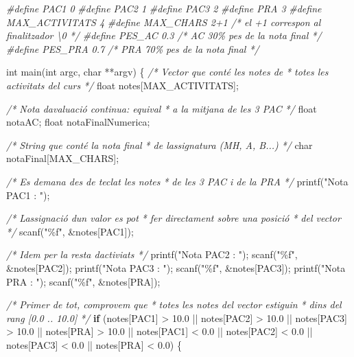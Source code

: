 \documentclass[
]{book}
\newenvironment{Shaded}{\begin{snugshade}}{\end{snugshade}}
\newcommand{\CommentTok}[1]{\textcolor[rgb]{0.56,0.35,0.01}{\textit{#1}}}
\newcommand{\ControlFlowTok}[1]{\textcolor[rgb]{0.13,0.29,0.53}{\textbf{#1}}}
\newcommand{\DataTypeTok}[1]{\textcolor[rgb]{0.13,0.29,0.53}{#1}}
\newcommand{\FloatTok}[1]{\textcolor[rgb]{0.00,0.00,0.81}{#1}}
\newcommand{\NormalTok}[1]{#1}
\newcommand{\PreprocessorTok}[1]{\textcolor[rgb]{0.56,0.35,0.01}{\textit{#1}}}
\newcommand{\StringTok}[1]{\textcolor[rgb]{0.31,0.60,0.02}{#1}}
\begin{document}
\begin{Shaded}
\begin{Highlighting}[]
\PreprocessorTok{\#define PAC1 0}
\PreprocessorTok{\#define PAC2 1}
\PreprocessorTok{\#define PAC3 2}
\PreprocessorTok{\#define PRA 3}
\PreprocessorTok{\#define MAX\_ACTIVITATS 4}
\PreprocessorTok{\#define MAX\_CHARS 2+1    /* el +1 correspon al finalitzador \textquotesingle{}\textbackslash{}0\textquotesingle{} */}
\PreprocessorTok{\#define PES\_AC 0.3       }\CommentTok{/* AC 30\% pes de la nota final */}
\PreprocessorTok{\#define PES\_PRA 0.7      }\CommentTok{/* PRA 70\% pes de la nota final */}

\DataTypeTok{int}\NormalTok{ main(}\DataTypeTok{int}\NormalTok{ argc, }\DataTypeTok{char}\NormalTok{ **argv) \{}
    \CommentTok{/* Vector que conté les notes de }
\CommentTok{     * totes les activitats del curs }
\CommentTok{     */}
    \DataTypeTok{float}\NormalTok{ notes[MAX\_ACTIVITATS]; }

    \CommentTok{/* Nota d\textquotesingle{}avaluació continua: equival}
\CommentTok{     * a la mitjana de les 3 PAC }
\CommentTok{     */}
    \DataTypeTok{float}\NormalTok{ notaAC;}
    \DataTypeTok{float}\NormalTok{ notaFinalNumerica;}

    \CommentTok{/* String que conté la nota final }
\CommentTok{     * de l\textquotesingle{}assignatura (MH, A, B...) }
\CommentTok{     */}
    \DataTypeTok{char}\NormalTok{ notaFinal[MAX\_CHARS];}

    \CommentTok{/* Es demana des de teclat les notes}
\CommentTok{     * de les 3 PAC i de la PRA }
\CommentTok{     */}
\NormalTok{    printf(}\StringTok{"Nota PAC1 : "}\NormalTok{);}

    \CommentTok{/* L\textquotesingle{}assignació d\textquotesingle{}un valor es pot}
\CommentTok{     * fer directament sobre una posició}
\CommentTok{     * del vector}
\CommentTok{     */}
\NormalTok{    scanf(}\StringTok{"\%f"}\NormalTok{, \&notes[PAC1]);}

    \CommentTok{/* Idem per la resta d\textquotesingle{}activiats */}
\NormalTok{    printf(}\StringTok{"Nota PAC2 : "}\NormalTok{);}
\NormalTok{    scanf(}\StringTok{"\%f"}\NormalTok{, \&notes[PAC2]);}
\NormalTok{    printf(}\StringTok{"Nota PAC3 : "}\NormalTok{);}
\NormalTok{    scanf(}\StringTok{"\%f"}\NormalTok{, \&notes[PAC3]);}
\NormalTok{    printf(}\StringTok{"Nota PRA : "}\NormalTok{);}
\NormalTok{    scanf(}\StringTok{"\%f"}\NormalTok{, \&notes[PRA]);}

    \CommentTok{/* Primer de tot, comprovem que}
\CommentTok{     * totes les notes del vector estiguin}
\CommentTok{     * dins del rang [0.0 .. 10.0]}
\CommentTok{     */}
    \ControlFlowTok{if}\NormalTok{ (notes[PAC1] \textgreater{} }\FloatTok{10.0}\NormalTok{ || notes[PAC2] \textgreater{} }\FloatTok{10.0}\NormalTok{ ||}
\NormalTok{        notes[PAC3] \textgreater{} }\FloatTok{10.0}\NormalTok{ || notes[PRA] \textgreater{} }\FloatTok{10.0}\NormalTok{ ||}
\NormalTok{        notes[PAC1] \textless{} }\FloatTok{0.0}\NormalTok{ || notes[PAC2] \textless{} }\FloatTok{0.0}\NormalTok{ ||}
\NormalTok{        notes[PAC3] \textless{} }\FloatTok{0.0}\NormalTok{ || notes[PRA] \textless{} }\FloatTok{0.0}\NormalTok{) \{}


\end{Highlighting}
\end{Shaded}
\end{document}
